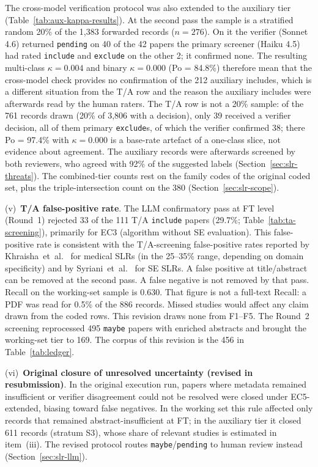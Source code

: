 The cross-model verification protocol was also extended to the auxiliary
tier (Table~\ref{tab:aux-kappa-results}). At the second pass the sample is
a stratified random 20\% of the 1{,}383 forwarded records ($n = 276$). On
it the verifier (Sonnet 4.6) returned \texttt{pending} on 40 of the 42
papers the primary screener (Haiku 4.5) had rated \texttt{include} and
\texttt{exclude} on the other 2; it confirmed none. The resulting
multi-class $\kappa = 0.004$ and binary $\kappa = 0.000$ (Po = 84.8\%)
therefore mean that the cross-model check provides no confirmation of the
212 auxiliary includes, which is a different situation from the T/A row
and the reason the auxiliary includes were afterwards read by the human
raters. The T/A row is not a 20\% sample: of the 761 records drawn (20\%
of 3{,}806 with a decision), only 39 received a verifier decision, all of
them primary \texttt{exclude}s, of which the verifier confirmed 38; there
Po = 97.4\% with $\kappa = 0.000$ is a base-rate artefact of a one-class
slice, not evidence about agreement. The auxiliary records were afterwards
screened by both reviewers, who agreed with 92\% of the suggested labels
(Section~\ref{sec:slr-threats}). The combined-tier counts rest on the
family codes of the original coded set, plus the triple-intersection count
on the 380 (Section~\ref{sec:slr-scope}).



(v)~\textbf{T/A false-positive rate}.
The LLM confirmatory pass at FT level (Round~1) rejected 33 of the 111 T/A
\texttt{include} papers (29.7\%; Table~\ref{tab:ta-screening}), primarily for EC3 (algorithm without SE
evaluation). This false-positive rate is consistent with the
T/A-screening false-positive rates reported by Khraisha~et~al.\
\cite{khraisha2024} for medical SLRs (in the 25--35\% range, depending on
domain specificity) and by Syriani~et~al.~\cite{syriani2023} for SE
SLRs. A false positive at title/abstract can be removed at the second
pass. A false negative is not removed by that pass. Recall on
the working-set sample is 0.630. That figure is not a full-text Recall:
a PDF was read for 0.5\% of the 886 records. Missed studies would affect any claim
drawn from the coded rows. This revision draws none from F1--F5. The Round~2
screening reprocessed 495 \texttt{maybe} papers with enriched abstracts and
brought the working-set tier to 169. The corpus of this revision is the
456 in Table~\ref{tab:ledger}.

(vi)~\textbf{Original closure of unresolved uncertainty (revised in resubmission)}.
In the original execution run, papers where metadata remained insufficient or
verifier disagreement could not be resolved were closed under EC5-extended,
biasing toward false negatives. In the working set this rule affected only
records that remained abstract-insufficient at FT; in the auxiliary tier it
closed 611 records (stratum S3), whose share of relevant studies is
estimated in item~(iii). The revised protocol routes
\texttt{maybe}/\texttt{pending} to human review instead
(Section~\ref{sec:slr-llm}).


